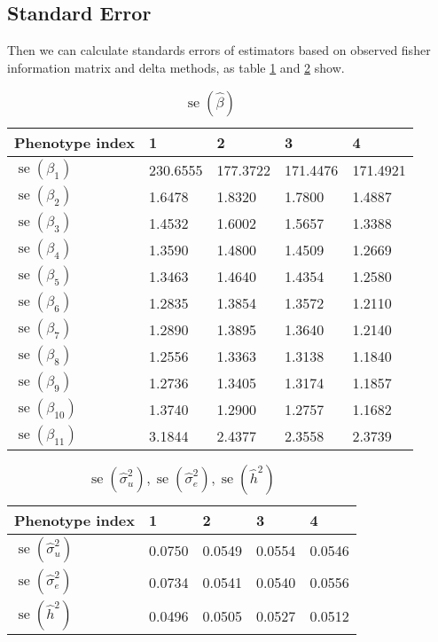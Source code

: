 \documentclass{article}
\newcommand{\se}[1]{\operatorname{se}(#1)}
\begin{document}
\subsection{Standard Error}

Then we can calculate standards errors of estimators based on observed fisher information matrix and delta methods, as table \ref{table_beta_se} and \ref{table_sigma_h_se} show.

\begin{table}[htbp]
	\caption{$ \se{\hat{\beta}} $}
	\label{table_beta_se}
	\centering
	\begin{tabular}{lllll}
		\toprule
		Phenotype index	& 1 & 2 & 3 & 4 \\
		\midrule
		$ \se{\beta_1} $ & 230.6555 & 177.3722 & 171.4476 & 171.4921 \\
		$ \se{\beta_2} $ & 1.6478 & 1.8320 & 1.7800 & 1.4887 \\
		$ \se{\beta_3} $ & 1.4532 & 1.6002 & 1.5657 & 1.3388 \\
		$ \se{\beta_4} $ & 1.3590 & 1.4800 & 1.4509 & 1.2669 \\
		$ \se{\beta_5} $ & 1.3463 & 1.4640 & 1.4354 & 1.2580 \\
		$ \se{\beta_6} $ & 1.2835 & 1.3854 & 1.3572 & 1.2110 \\
		$ \se{\beta_7} $ & 1.2890 & 1.3895 & 1.3640 & 1.2140 \\
		$ \se{\beta_8} $ & 1.2556 & 1.3363 & 1.3138 & 1.1840 \\
		$ \se{\beta_9} $ & 1.2736 & 1.3405 & 1.3174 & 1.1857 \\
		$ \se{\beta_{10}} $ & 1.3740 & 1.2900 & 1.2757 & 1.1682 \\
		$ \se{\beta_{11}} $ & 3.1844 & 2.4377 & 2.3558 & 2.3739 \\
		\bottomrule
	\end{tabular}
\end{table}

\begin{table}[htbp]
	\caption{$ \se{\hat{\sigma}^{2}_{u}}, \se{\hat{\sigma}^{2}_{e}}, \se{\hat{h}^{2}} $}
	\label{table_sigma_h_se}
	\centering
	\begin{tabular}{lllll}
		\toprule
		Phenotype index	& 1 & 2 & 3 & 4 \\
		\midrule
		$ \se{\hat{\sigma}^{2}_{u}} $ & 0.0750 & 0.0549 & 0.0554 & 0.0546 \\
		$ \se{\hat{\sigma}^{2}_{e}} $ & 0.0734 & 0.0541 & 0.0540 & 0.0556 \\
		$ \se{\hat{h}^{2}} $ & 0.0496& 0.0505 & 0.0527 & 0.0512 \\
		\bottomrule
	\end{tabular}
\end{table}
\end{document}
